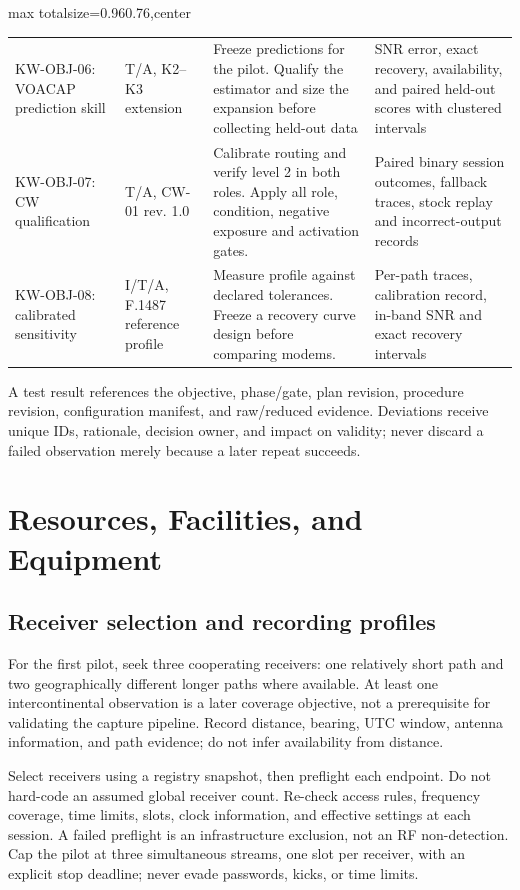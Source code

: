 \documentclass[11pt,a4paper]{article}
\newlength{\tableavail}
\begin{document}
\begin{landscape}
\begin{adjustbox}{max totalsize={0.96\linewidth}{0.76\textheight},center}
\begin{tabular}{@{}>{\raggedright\arraybackslash}p{0.18\tableavail}>{\raggedright\arraybackslash}p{0.25\tableavail}>{\raggedright\arraybackslash}p{0.32\tableavail}>{\raggedright\arraybackslash}p{0.25\tableavail}@{}}
KW-OBJ-06: VOACAP prediction skill & T/A, K2--K3 extension & Freeze predictions for the pilot. Qualify the estimator and size the expansion before collecting held-out data & SNR error, exact recovery, availability, and paired held-out scores with clustered intervals\\[5pt]
KW-OBJ-07: CW qualification & T/A, CW-01 rev. 1.0 & Calibrate routing and verify level 2 in both roles. Apply all role, condition, negative exposure and activation gates. & Paired binary session outcomes, fallback traces, stock replay and incorrect-output records\\[5pt]
KW-OBJ-08: calibrated sensitivity & I/T/A, F.1487 reference profile & Measure profile against declared tolerances. Freeze a recovery curve design before comparing modems. & Per-path traces, calibration record, in-band SNR and exact recovery intervals\\[5pt]
\bottomrule
\end{tabular}
\end{adjustbox}
\end{landscape}
A test result references the objective, phase/gate, plan revision, procedure revision, configuration manifest, and raw/reduced evidence. Deviations receive unique IDs, rationale, decision owner, and impact on validity; never discard a failed observation merely because a later repeat succeeds.


\section{Resources, Facilities, and Equipment}
\label{tp:resources}

\subsection{Receiver selection and recording profiles}
\label{md:4}

For the first pilot, seek three cooperating receivers: one relatively short path and two geographically different longer paths where available. At least one intercontinental observation is a later coverage objective, not a prerequisite for validating the capture pipeline. Record distance, bearing, UTC window, antenna information, and path evidence; do not infer availability from distance.

Select receivers using a registry snapshot, then preflight each endpoint. Do not hard-code an assumed global receiver count. Re-check access rules, frequency coverage, time limits, slots, clock information, and effective settings at each session. A failed preflight is an infrastructure exclusion, not an RF non-detection. Cap the pilot at three simultaneous streams, one slot per receiver, with an explicit stop deadline; never evade passwords, kicks, or time limits.
\end{document}
